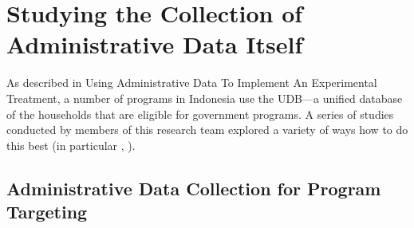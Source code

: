 \documentclass[
]{book}
\begin{document}
\hypertarget{studying-the-collection-of-administrative-data-itself}{%
\section{Studying the Collection of Administrative Data Itself}\label{studying-the-collection-of-administrative-data-itself}}

As described in Using Administrative Data To Implement An Experimental Treatment, a number of programs in Indonesia use the UDB---a unified database of the households that are eligible for government programs. A series of studies conducted by members of this research team explored a variety of ways how to do this best (in particular \citet{alatas2012}, \citet{alatas2016}).

\hypertarget{administrative-data-collection-for-program-targeting}{%
\subsection{Administrative Data Collection for Program Targeting}\label{administrative-data-collection-for-program-targeting}}
\end{document}

